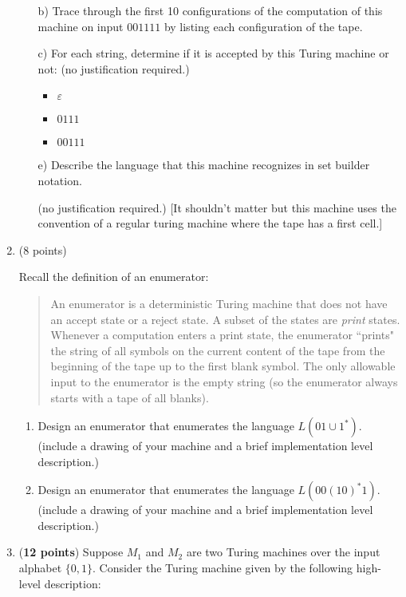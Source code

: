 \documentclass[10pt,letterpaper,unboxed,cm]{article}
\begin{document}
\begin{enumerate}
\begin{itemize}
\item[b)]
Trace through the first 10 configurations of the computation of this machine on input $001111$ by listing 
each configuration of the tape.
\item[c)]
For each string, determine if it is accepted by this Turing machine or not: (no justification required.)
\begin{itemize}
\item
$\varepsilon$
\item
$0111$
\item
$00111$
\end{itemize}
\item[e)]
Describe the language that this machine recognizes in set builder notation.

(no justification required.)
[It shouldn't matter but this machine uses the convention of a regular turing machine where the tape has a first cell.]
\end{itemize}


\item (8 points)

Recall the definition of an enumerator:

\begin{quote}
An enumerator is a deterministic Turing machine that does not have an accept state or a reject state. A subset of the states are \emph{print} states.
Whenever a computation enters a print state, the enumerator ``prints" the string of all symbols on the current content of the tape from the beginning of the tape up to the first blank symbol. The only allowable input to the enumerator is the empty string (so the enumerator always starts with a tape of all blanks).
\end{quote}

\begin{enumerate}
\item
Design an enumerator that enumerates the language $L(01\cup 1^*)$. (include a drawing of your machine and a brief implementation level description.)

\item
Design an enumerator that enumerates the language $L(00(10)^*1)$. (include a drawing of your machine and a brief implementation level description.)

\end{enumerate}

\item
({\bf 12 points})
Suppose $M_1$ and $M_2$ are two Turing machines over the input alphabet $\{0,1\}$. Consider the Turing machine given by the following high-level description:


\end{enumerate}
\end{document}
